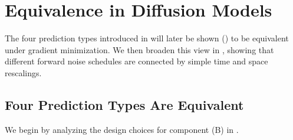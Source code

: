 \clearpage
\newpage





\section{Equivalence in Diffusion Models}\label{sec:equivalent-parametrizations}

The four prediction types introduced in  will later be shown () to be equivalent under gradient minimization.  
We then broaden this view in , showing that different forward noise schedules are connected by simple time and space rescalings.





\subsection{Four Prediction Types Are Equivalent}\label{subsec:four-equiv-para}
We begin by analyzing the design choices for component (B) in . 

